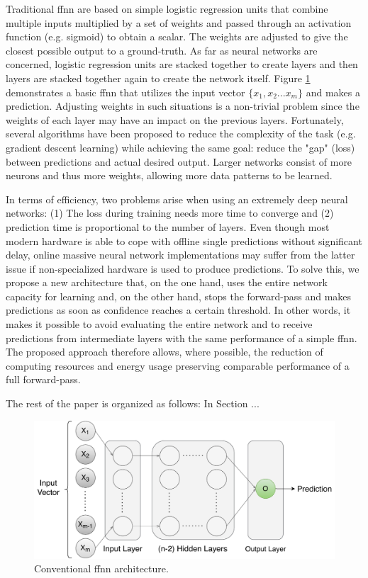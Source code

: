 \documentclass[conference]{IEEEtran}
\begin{document}
Traditional \gls{ffnn} are based on simple logistic regression units that combine multiple inputs multiplied by a set of weights and passed through an activation function (e.g. sigmoid) to obtain a scalar. The weights are adjusted to give the closest possible output to a ground-truth. As far as neural networks are concerned, logistic regression units are stacked together to create layers and then layers are stacked together again to create the network itself. Figure \ref{fig:ffnn} demonstrates a basic \gls{ffnn} that utilizes the input vector $\lbrace x_{1}, x_{2} ... x_{m} \rbrace$ and makes a prediction. Adjusting weights in such situations is a non-trivial problem since the weights of each layer may have an impact on the previous layers. Fortunately, several algorithms have been proposed to reduce the complexity of the task (e.g. gradient descent learning) while achieving the same goal: reduce the "gap" (loss) between predictions and actual desired output. Larger networks consist of more neurons and thus more weights, allowing more data patterns to be learned.

In terms of efficiency, two problems arise when using an extremely deep neural networks: (1) The loss during training needs more time to converge and (2) prediction time is proportional to the number of layers. Even though most modern hardware is able to cope with offline single predictions without significant delay, online massive neural network implementations may suffer from the latter issue if non-specialized hardware is used to produce predictions.
To solve this, we propose a new architecture that, on the one hand, uses the entire network capacity for learning and, on the other hand, stops the forward-pass and makes predictions as soon as confidence reaches a certain threshold. In other words, it makes it possible to avoid evaluating the entire network and to receive predictions from intermediate layers with the same performance of a simple \gls{ffnn}. The proposed approach therefore allows, where possible, the reduction of computing resources and energy usage preserving comparable performance of a full forward-pass.


The rest of the paper is organized as follows: In Section ...

 \begin{figure}
  \includegraphics[width=\linewidth]{figures/ffnn_new.pdf}
  \caption{Conventional \gls{ffnn} architecture.}
  \label{fig:ffnn}
\end{figure}
\end{document}
